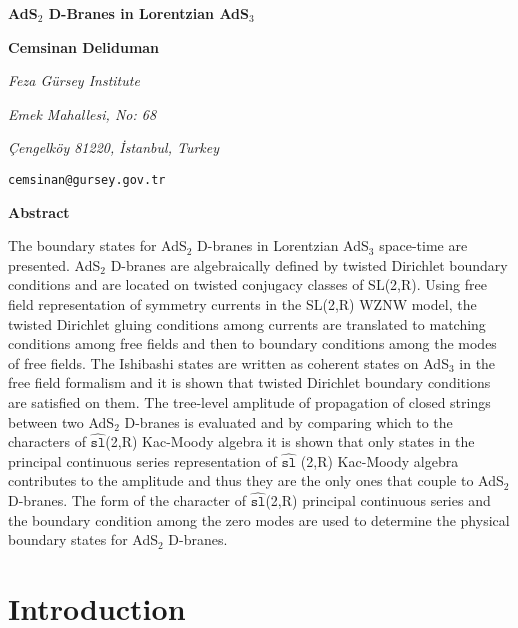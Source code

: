 \documentclass[a4paper,12pt]{article}
\begin{document}
\thispagestyle{empty} 

{\vskip2.0cm}

\begin{center}
{\Large \textbf{AdS$_{2}$ D-Branes in Lorentzian AdS$_{3}$}}

{\vskip0.5cm}

\textbf{Cemsinan Deliduman}

{\vskip0.5cm}

\textit{Feza G\"{u}rsey Institute}

\textit{Emek Mahallesi, No: 68}

\textit{\c{C}engelk\"{o}y 81220, \.{I}stanbul, Turkey}

\texttt{cemsinan@gursey.gov.tr}

{\vskip1.0cm}

\textbf{Abstract}

{\vskip0.5cm}
\end{center}

The boundary states for AdS$_{2}$ D-branes in Lorentzian AdS$_{3}$
space-time are presented. AdS$_{2}$ D-branes are algebraically defined by
twisted Dirichlet boundary conditions and are located on twisted conjugacy
classes of SL(2,R). Using free field representation of symmetry currents in
the SL(2,R) WZNW model, the twisted Dirichlet gluing conditions among
currents are translated to matching conditions among free fields and then to
boundary conditions among the modes of free fields. The Ishibashi states are
written as coherent states on AdS$_{3}$ in the free field formalism and it
is shown that twisted Dirichlet boundary conditions are satisfied on them.
The tree-level amplitude of propagation of closed strings between two AdS$%
_{2}$ D-branes is evaluated and by comparing which to the characters of $%
\widehat{\mathtt{sl}}$(2,R) Kac-Moody algebra it is shown that only states
in the principal continuous series representation of $\widehat{\mathtt{sl}}$%
(2,R) Kac-Moody algebra contributes to the amplitude and thus they are the
only ones that couple to AdS$_{2}$ D-branes. The form of the character of $%
\widehat{\mathtt{sl}}$(2,R) principal continuous series and the boundary
condition among the zero modes are used to determine the physical boundary
states for AdS$_{2}$ D-branes.

\newpage {}

\section{Introduction}
\end{document}
